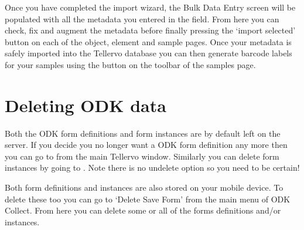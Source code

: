 Once you have completed the import wizard, the Bulk Data Entry screen will be populated with all the metadata you entered in the field.  From here you can check, fix and augment the metadata before finally pressing the `import selected' button on each of the object, element and sample pages.  Once your metadata is safely imported into the Tellervo database you can then generate barcode labels for your samples using the button on the toolbar of the samples page.

\section{Deleting ODK data}
Both the ODK form definitions and form instances are by default left on the server.  If you decide you no longer want a ODK form definition any more then you can go to  from the main Tellervo window.  Similarly you can delete form instances by going to .  Note there is no undelete option so you need to be certain!

Both form definitions and instances are also stored on your mobile device.  To delete these too you can go to `Delete Save Form' from the main menu of ODK Collect.  From here you can delete some or all of the forms definitions and/or instances.

